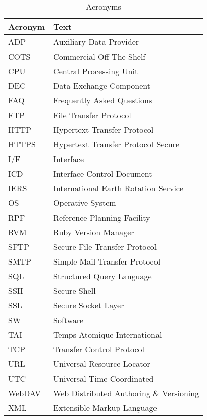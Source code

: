 \documentclass[dec_sum_main.tex]{subfiles}
\begin{document}
\begin{longtable}{|m{2.8cm}|m{10cm}|}
	\caption{Acronyms\label{long}} \\
    \hline
	\textbf{Acronym} & \textbf{Text} \\
	\hline
	ADP & Auxiliary Data Provider \\ \hline
	COTS & Commercial Off The Shelf \\ \hline
	CPU & Central Processing Unit \\ \hline
	DEC & Data Exchange Component \\ \hline
	FAQ & Frequently Asked Questions \\ \hline
	FTP & File Transfer Protocol \\ \hline
	HTTP & Hypertext Transfer Protocol \\ \hline
	HTTPS & Hypertext Transfer Protocol Secure\\ \hline
	I/F & Interface \\ \hline
	ICD & Interface Control Document \\ \hline
	IERS & International Earth Rotation Service \\ \hline
	OS & Operative System \\ \hline
	RPF & Reference Planning Facility \\ \hline
	RVM & Ruby Version Manager \\ \hline
	SFTP & Secure File Transfer Protocol \\ \hline
	SMTP & Simple Mail Transfer Protocol \\ \hline
	SQL & Structured Query Language \\ \hline
	SSH & Secure Shell \\ \hline
	SSL & Secure Socket Layer \\ \hline
	SW & Software \\ \hline
	TAI & Temps Atomique International \\ \hline
	TCP & Transfer Control Protocol \\ \hline
	URL & Universal Resource Locator \\ \hline
	UTC & Universal Time Coordinated \\ \hline
	WebDAV & Web Distributed Authoring \& Versioning \\ \hline
	XML & Extensible Markup Language \\ \hline						
\end{longtable}
\end{document}
